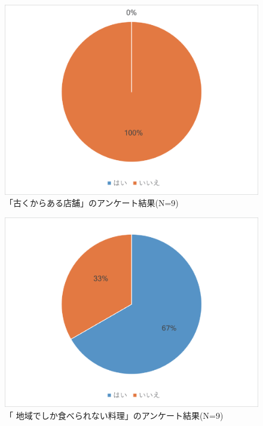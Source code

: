 \documentclass{funthesis}
\begin{document}
\begin{figure}[tbp]
  \begin{center}
    \includegraphics[clip,width=12cm]{5.5.eps}
    \caption[「古くからある店舗」のアンケート結果]{「古くからある店舗」のアンケート結果(N=9)}
  \end{center}
\end{figure}

\begin{figure}[tbp]
  \begin{center}
    \includegraphics[clip,width=12cm]{5.6.eps}
    \caption[「 地域でしか食べられない料理」のアンケート結果]{「 地域でしか食べられない料理」のアンケート結果(N=9)}
  \end{center}
\end{figure}
\end{document}
